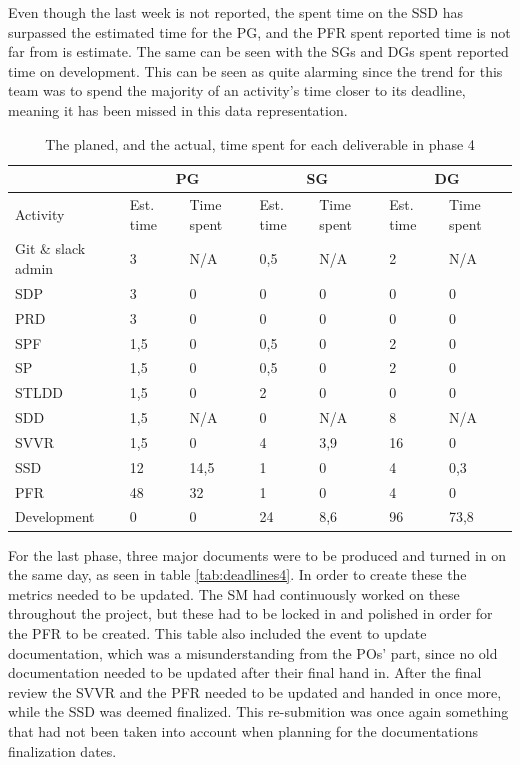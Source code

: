 \documentclass{article}
\begin{document}
Even though the last week is not reported, the spent time on the SSD has surpassed the estimated time for the PG, and the PFR spent reported time is not far from is estimate. The same can be seen with the SGs and DGs spent reported time on development. This can be seen as quite alarming since the trend for this team was to spend the majority of an activity's time closer to its deadline, meaning it has been missed in this data representation. 
 
\begin{table}[h!]
    \centering
    \begin{tabular}{l|l|l|l|l|l|l|}
    \cline{2-7}
    & \multicolumn{2}{c|}{PG} & \multicolumn{2}{c|}{SG} & \multicolumn{2}{c|}{DG} \\ \hline
    \multicolumn{1}{|l|}{Activity} & Est. time & Time spent &  Est. time & Time spent & Est. time & Time spent        \\ \hline
    \multicolumn{1}{|l|}{Git \& slack admin} & 3 & N/A & 0,5 & N/A  & 2 & N/A\\ \hline
    \multicolumn{1}{|l|}{SDP} & 3 & 0 & 0 & 0 & 0 & 0 \\ \hline
    \multicolumn{1}{|l|}{PRD} & 3 & 0 & 0 & 0 & 0 & 0 \\ \hline
    \multicolumn{1}{|l|}{SPF} & 1,5 & 0 & 0,5 & 0 & 2 & 0 \\ \hline
    \multicolumn{1}{|l|}{SP} & 1,5 & 0 & 0,5 & 0 & 2 & 0 \\ \hline
    \multicolumn{1}{|l|}{STLDD} & 1,5 & 0 & 2 & 0 & 0 & 0 \\ \hline
    \multicolumn{1}{|l|}{SDD} & 1,5 & N/A & 0 & N/A & 8 & N/A \\ \hline    
    \multicolumn{1}{|l|}{SVVR} & 1,5 & 0 & 4 & 3,9 & 16 & 0 \\ \hline
    \multicolumn{1}{|l|}{SSD} & 12 & 14,5 & 1 & 0 & 4 & 0,3\\ \hline
    \multicolumn{1}{|l|}{PFR} & 48 & 32 & 1 & 0 & 4 & 0\\ \hline
   \multicolumn{1}{|l|}{Development} & 0 & 0 & 24 & 8,6 & 96 & 73,8 \\ \hline    
\end{tabular}
\caption{The planed, and the actual, time spent for each deliverable in phase 4}
\label{tab:timeSpent4}
\end{table}

For the last phase, three major documents were to be produced and turned in on the same day, as seen in table \ref{tab:deadlines4}. In order to create these the metrics needed to be updated. The SM had continuously worked on these throughout the project, but these had to be locked in and polished in order for the PFR to be created. This table also included the event to update documentation, which was a misunderstanding from the POs' part, since no old documentation needed to be updated after their final hand in. After the final review the SVVR and the PFR needed to be updated and handed in once more, while the SSD was deemed finalized. This re-submition was once again something that had not been taken into account when planning for the documentations finalization dates.
\end{document}
